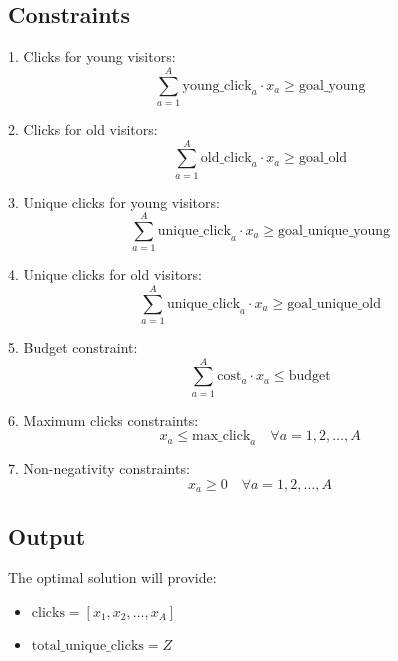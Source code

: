 \documentclass{article}
\begin{document}
\subsection*{Constraints}
1. Clicks for young visitors:
\[
\sum_{a=1}^{A} \text{young\_click}_a \cdot x_a \geq \text{goal\_young}
\]

2. Clicks for old visitors:
\[
\sum_{a=1}^{A} \text{old\_click}_a \cdot x_a \geq \text{goal\_old}
\]

3. Unique clicks for young visitors:
\[
\sum_{a=1}^{A} \text{unique\_click}_a \cdot x_a \geq \text{goal\_unique\_young}
\]

4. Unique clicks for old visitors:
\[
\sum_{a=1}^{A} \text{unique\_click}_a \cdot x_a \geq \text{goal\_unique\_old}
\]

5. Budget constraint:
\[
\sum_{a=1}^{A} \text{cost}_a \cdot x_a \leq \text{budget}
\]

6. Maximum clicks constraints:
\[
x_a \leq \text{max\_click}_a \quad \forall a = 1, 2, \ldots, A
\]

7. Non-negativity constraints:
\[
x_a \geq 0 \quad \forall a = 1, 2, \ldots, A
\]

\subsection*{Output}
The optimal solution will provide:
\begin{itemize}
    \item \( \text{clicks} = [x_1, x_2, \ldots, x_A] \)
    \item \( \text{total\_unique\_clicks} = Z \)
\end{itemize}
\end{document}
